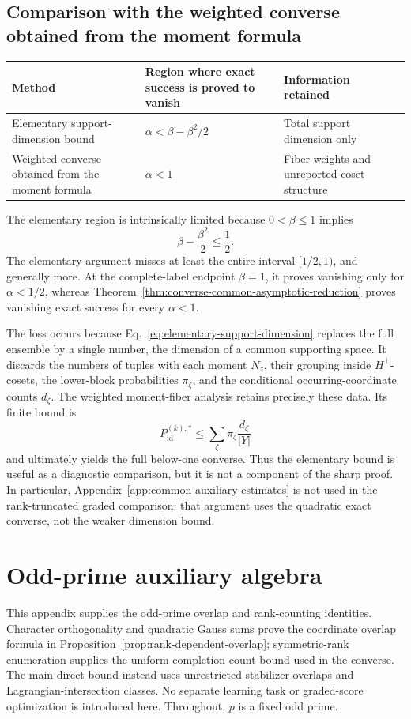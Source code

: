 \documentclass[11pt]{article}
\newcommand{\1}{\mathbf 1}
\theoremstyle{plain}
\theoremstyle{definition}
\theoremstyle{remark}
\begin{document}
\subsection{Comparison with the weighted converse obtained from the moment formula}
\begin{center}
\small
\begin{tabularx}{\textwidth}{@{}Y >{\centering\arraybackslash}p{0.27\textwidth} Y@{}}
\toprule
Method & Region where exact success is proved to vanish & Information retained\\
\midrule
Elementary support-dimension bound
 & $\alpha<\beta-\beta^2/2$ & Total support dimension only\\
Weighted converse obtained from the moment formula
 & $\alpha<1$ & Fiber weights and unreported-coset structure\\
\bottomrule
\end{tabularx}
\end{center}
The elementary region is intrinsically limited because
$0<\beta\le1$ implies
\begin{equation}
 \beta-\frac{\beta^2}{2}\le\frac12.
 \label{eq:appendix-dimension-max-half}
\end{equation}
The elementary argument misses at least the entire interval
$[1/2,1)$, and generally more.  At the complete-label endpoint $\beta=1$, it
proves vanishing only for $\alpha<1/2$, whereas
Theorem~\ref{thm:converse-common-asymptotic-reduction} proves vanishing exact success for every
$\alpha<1$.

The loss occurs because Eq.~\eqref{eq:elementary-support-dimension} replaces
the full ensemble by a single number, the dimension of a common supporting
space.  It discards the numbers of tuples with each moment $N_z$, their grouping inside
$H^\perp$-cosets, the lower-block probabilities $\pi_{\zeta}$, and the conditional
occurring-coordinate counts $d_{\zeta}$.  The weighted moment-fiber analysis retains precisely these data.  Its finite
bound is
\[
 P_{\mathrm{id}}^{(k),*}
 \le\sum_{\zeta}\pi_{\zeta}\frac{d_{\zeta}}{\lvert Y\rvert}
\]
and ultimately yields the full below-one converse.  Thus the elementary bound is
useful as a diagnostic comparison, but it is not a component of the sharp
proof.  In particular, Appendix~\ref{app:common-auxiliary-estimates} is not used in the rank-truncated graded
comparison: that argument uses the quadratic exact converse, not the weaker
dimension bound.

\section{Odd-prime auxiliary algebra}
\label{app:odd-prime-algebra}
This appendix supplies the odd-prime overlap and rank-counting identities.
Character orthogonality and quadratic Gauss sums prove the coordinate overlap
formula in Proposition~\ref{prop:rank-dependent-overlap}; symmetric-rank
enumeration supplies the uniform completion-count bound used in the converse.
The main direct bound instead uses unrestricted stabilizer overlaps and
Lagrangian-intersection classes.  No separate learning task or graded-score
optimization is introduced here.  Throughout, $p$ is a fixed odd prime.
\end{document}
